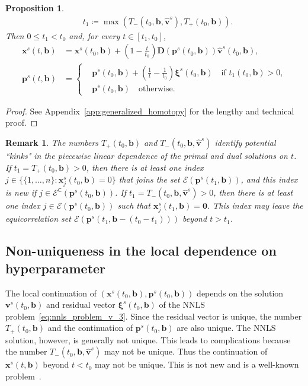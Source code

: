 \documentclass[11pt]{article}
\newtheorem{prop}{Proposition}[section]
\numberwithin{prop}{section}
\numberwithin{lem}{section}
\newtheorem{rem}{Remark}[section]
\numberwithin{rem}{section}
\numberwithin{cor}{section}
\numberwithin{thm}{section}
\numberwithin{defn}{section}
\numberwithin{fact}{section}
\theoremstyle{plain}
\def\bb {\boldsymbol{b}}
\def\tzero {t_{0}}
\def\bp {\boldsymbol{p}}
\def\bv {\boldsymbol{v}}
\def\bx {\boldsymbol{x}}
\def\bxi {\boldsymbol{\xi}}
\newcommand{\matr}[1]{\bm{#1}}
\def\eqset {\mathcal{E}}
\def\eqcset {\mathcal{E}^{\mathsf{C}}}
\begin{document}
\begin{prop}
\begin{equation}
\begin{alignedat}{1}
    & t_{1} \coloneqq \max\left(T_{-}(\tzero,\bb,\hat{\bv}^{s}),T_{+}(\tzero,\bb)\right).
    \end{alignedat}
    \end{equation} 
    Then $0 \leqslant t_{1} < \tzero$ and, for every $t \in [t_{1}, \tzero]$,
    \begin{equation}\label{eq:homotopy_solutions}
    \begin{alignedat}{1}
    	\bx^{s}(t,\bb) &= \bx^{s}(\tzero,\bb) + \left(1 - \frac{t}{\tzero}\right) \matr{D}(\bp^{s}(\tzero,\bb))\hat{\bv}^{s}(\tzero,\bb), \\
    	\bp^{s}(t,\bb) &= \begin{cases}
 		&\bp^{s}(\tzero,\bb) + \left(\frac{1}{t} - \frac{1}{\tzero}\right)\bxi^{s}(\tzero,\bb) \quad \text{if $t_{1}(\tzero,\bb) > 0$}, \\
 		&\bp^{s}(\tzero,\bb) \quad \text{otherwise.}
 		\end{cases}
    \end{alignedat}
    \end{equation}
\end{prop}
\begin{proof}
See Appendix~\ref{app:generalized_homotopy} for the lengthy and technical proof.
\end{proof}


\begin{rem}\label{rem:kinks}
The numbers $T_{+}(\tzero,\bb)$ and $T_{-}(\tzero,\bb,\hat{\bv}^{s})$ identify potential ``kinks" in the piecewise linear dependence of the primal and dual solutions on $t$. If $t_{1} = T_{+}(\tzero,\bb) > 0$, then there is at least one index $j \in \{\{1,\dots,n\} : \bx^{s}_{j}(\tzero,\bb) = 0\}$ that joins the set $\eqset(\bp^{s}(t_{1},\bb))$, and this index is new if $j \in \eqcset(\bp^{s}(\tzero,\bb))$. If $t_{1} = T_{-}(\tzero,\bb,\hat{\bv}^{s}) > 0$, then there is at least one index $j \in \eqset(\bp^{s}(\tzero,\bb))$ such that $\bx^{s}_{j}(t_{1}, \bb) = \boldsymbol{0}$. This index may leave the equicorrelation set $\eqset(\bp^{s}(t_{1},\bb-(\tzero-t_{1})))$ beyond $t > t_{1}$.
\end{rem}






\subsection{Non-uniqueness in the local dependence on hyperparameter}\label{subsec:non-uniqueness}
The local continuation of $(\bx^{s}(\tzero,\bb),\bp^{s}(\tzero,\bb))$ depends on the solution $\bv^{s}(\tzero,\bb)$ and residual vector $\bxi^{s}(\tzero,\bb)$ of the NNLS problem~\eqref{eq:nnls_problem_v_3}. Since the residual vector is unique, the number $T_{+}(\tzero,\bb)$ and the continuation of $\bp^{s}(\tzero,\bb)$ are also unique. The NNLS solution, however, is generally not unique. This leads to complications because the number $T_{-}(\tzero,\bb,\hat{\bv}^{s})$ may not be unique. Thus the continuation of $\bx^{s}(t,\bb)$ beyond $t < \tzero$ may not be unique. This is not new and is a well-known problem~\cite{tibshirani2013lasso,bringmann2018homotopy}. 
\end{document}
